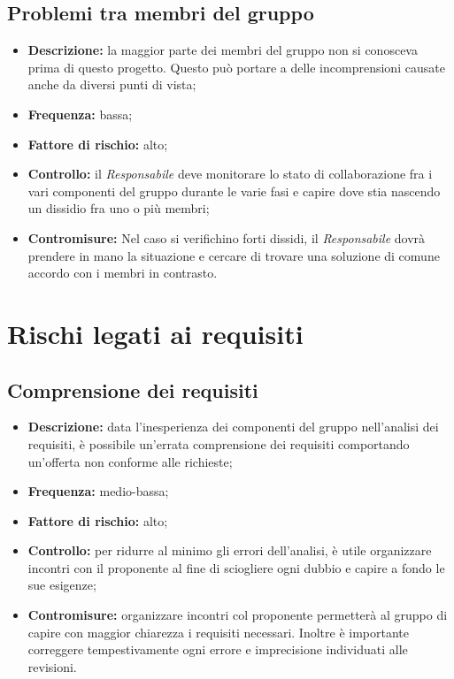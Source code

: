 \documentclass[./PianodiProgetto.tex]{subfiles}
\begin{document}
	\subsection{Problemi tra membri del gruppo}
	\begin{itemize}
		\item \textbf{Descrizione:} la maggior parte dei membri del gruppo non si conosceva prima di questo progetto. Questo può portare a delle incomprensioni causate anche da diversi punti di vista;
		\item \textbf{Frequenza:} bassa;
		\item \textbf{Fattore di rischio:} alto;
		\item \textbf{Controllo:} il \textit{Responsabile} deve monitorare lo stato di collaborazione fra i vari componenti del gruppo durante le varie fasi e capire dove stia nascendo un dissidio fra uno o più membri;
		\item \textbf{Contromisure:} Nel caso si verifichino forti dissidi, il \textit{Responsabile} dovrà prendere in mano la situazione e cercare di trovare una soluzione di comune accordo con i membri in contrasto. 
	\end{itemize}
	
	\section{Rischi legati ai requisiti}
	\subsection{Comprensione dei requisiti}
	\begin{itemize}
		\item \textbf{Descrizione:} data l'inesperienza dei componenti del gruppo nell'analisi dei requisiti, è possibile un'errata comprensione dei requisiti comportando un'offerta non conforme alle richieste;
		\item \textbf{Frequenza:} medio-bassa;
		\item \textbf{Fattore di rischio:} alto;
		\item \textbf{Controllo:} per ridurre al minimo gli errori dell'analisi, è utile organizzare incontri con il proponente al fine di sciogliere ogni dubbio e capire a fondo le sue esigenze;
		\item \textbf{Contromisure:} organizzare incontri col proponente permetterà al gruppo di capire con maggior chiarezza i requisiti necessari. Inoltre è importante correggere tempestivamente ogni errore e imprecisione individuati alle revisioni. 
	\end{itemize}
	
\end{document}

